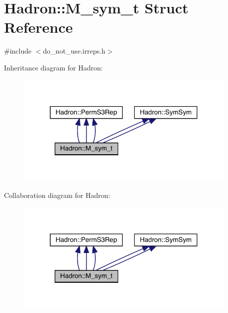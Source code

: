 \hypertarget{structHadron_1_1M__sym__t}{}\section{Hadron\+:\+:M\+\_\+sym\+\_\+t Struct Reference}
\label{structHadron_1_1M__sym__t}


{\ttfamily \#include $<$do\+\_\+not\+\_\+use.\+irreps.\+h$>$}



Inheritance diagram for Hadron\+:
\nopagebreak
\begin{figure}[H]
\begin{center}
\leavevmode
\includegraphics[width=302pt]{d8/d8f/structHadron_1_1M__sym__t__inherit__graph}
\end{center}
\end{figure}


Collaboration diagram for Hadron\+:
\nopagebreak
\begin{figure}[H]
\begin{center}
\leavevmode
\includegraphics[width=302pt]{d2/d71/structHadron_1_1M__sym__t__coll__graph}
\end{center}
\end{figure}
